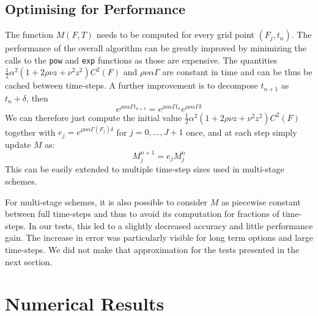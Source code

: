 \documentclass[]{rAMF2e}
\begin{document}
\subsection{Optimising for Performance}
The function $M(F,T)$ needs to be computed for every grid point $\left(F_j, t_n\right)$. The performance of the overall algorithm can be greatly improved by minimizing the calls to the \texttt{pow} and \texttt{exp} functions as those are expensive. The quantities $\frac{1}{2} \alpha^2 (1+2\rho\nu z+ \nu^2 z^2) C^2(F)$ and $\rho\nu\alpha\Gamma$ are constant in time and can be thus be cached between time-steps. A further improvement is to decompose $t_{n+1}$ as $t_{n}+\delta$, then 
\begin{equation}
e^{\rho\nu\alpha\Gamma t_{n+1}}=e^{\rho\nu\alpha\Gamma t_n}e^{\rho\nu\alpha\Gamma \delta}
\end{equation}
We can therefore just compute the initial value $\frac{1}{2} \alpha^2 (1+2\rho\nu z+ \nu^2 z^2) C^2(F)$ together with $e_j = e^{\rho\nu\alpha\Gamma(F_j) \delta}$ for $j=0,...,J+1$ once, and at each step simply update $M$ as:
\begin{equation}
M_j^{n+1} = e_j M_j^{n} 
\end{equation}
This can be easily extended to multiple time-step sizes used in multi-stage schemes.

For multi-stage schemes, it is also possible to consider $M$ as piecewise constant between full time-steps and thus to avoid its computation for fractions of time-steps. In our tests, this led to a slightly decreased accuracy and little performance gain. The increase in error was particularly visible for long term options and large time-steps. We did not make that approximation for the tests presented in the next section.

\section{Numerical Results}
\end{document}
